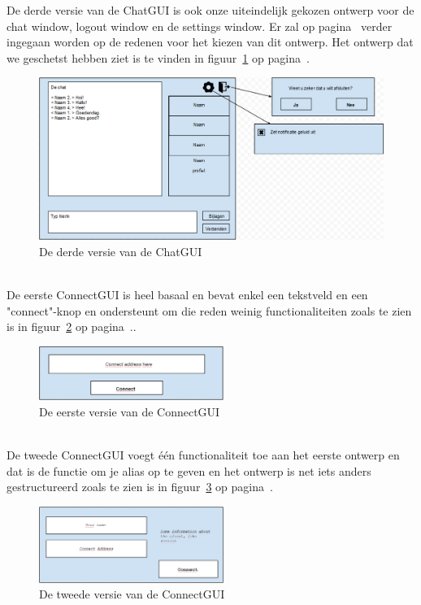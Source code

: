 \documentclass[12pt]{article}
\begin{document}
\noindent De derde versie van de ChatGUI is ook onze uiteindelijk gekozen ontwerp voor de chat window, logout window en de settings window. Er zal op pagina~\pageref{ChatGUI} verder ingegaan worden op de redenen voor het kiezen van dit ontwerp. Het ontwerp dat we geschetst hebben ziet is te vinden in figuur~\ref{figure003} op pagina~\pageref{figure003}.
\label{ChGv3Chat}
\begin{figure}[ht]
\begin{center}
\includegraphics[width = 150mm]{ChGDv3}
\caption{De derde versie van de ChatGUI}
\label{figure003}
\end{center}
\end{figure}
\\

\noindent De eerste ConnectGUI is heel basaal en bevat enkel een tekstveld en een "connect"-knop en ondersteunt om die reden weinig functionaliteiten zoals te zien is in figuur~\ref{figure004} op pagina~\pageref{figure004}..
\begin{figure}[ht]
\begin{center}
\includegraphics[width = 60mm]{CGDv1}
\caption{De eerste versie van de ConnectGUI}
\label{figure004}
\end{center}
\end{figure}
\\

\noindent De tweede ConnectGUI voegt \'e\'en functionaliteit toe aan het eerste ontwerp en dat is de functie om je alias op te geven en het ontwerp is net iets anders gestructureerd zoals te zien is in figuur~\ref{figure005} op pagina~\pageref{figure005}.
\begin{figure}[ht]
\begin{center}
\includegraphics[width = 60mm]{CGDv2}
\caption{De tweede versie van de ConnectGUI}
\label{figure005}
\end{center}
\end{figure}
\\
\end{document}
